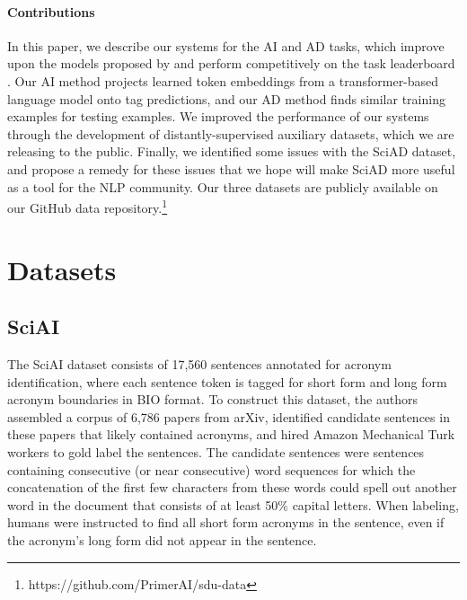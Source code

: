 \documentclass[letterpaper]{article} %
\begin{document}
\paragraph*{Contributions} In this paper, we describe our systems for the AI and AD tasks, which improve upon the models proposed by \citeauthor{veyseh-et-al-2020-what} and perform competitively on the task leaderboard \cite{shared-task}. Our AI method projects learned token embeddings from a transformer-based language model onto tag predictions, and our AD method finds similar training examples for testing examples. We improved the performance of our systems through the development of distantly-supervised auxiliary datasets, which we are releasing to the public. Finally, we identified some issues with the SciAD dataset, and propose a remedy for these issues that we hope will make SciAD more useful as a tool for the NLP community. Our three datasets are publicly available on our GitHub data repository.\footnote{https://github.com/PrimerAI/sdu-data}

\section{Datasets}
\subsection{SciAI}
The SciAI dataset \cite{veyseh-et-al-2020-what} consists of 17,560 sentences annotated for acronym identification, where each sentence token is tagged for short form and long form acronym boundaries in BIO format. To construct this dataset, the authors assembled a corpus of 6,786 papers from arXiv, identified candidate sentences in these papers that likely contained acronyms, and hired Amazon Mechanical Turk workers to gold label the sentences. The candidate sentences were sentences containing consecutive (or near consecutive) word sequences for which the concatenation of the first few characters from these words could spell out another word in the document that consists of at least 50\% capital letters. When labeling, humans were instructed to find all short form acronyms in the sentence, even if the acronym's long form did not appear in the sentence.
\end{document}
